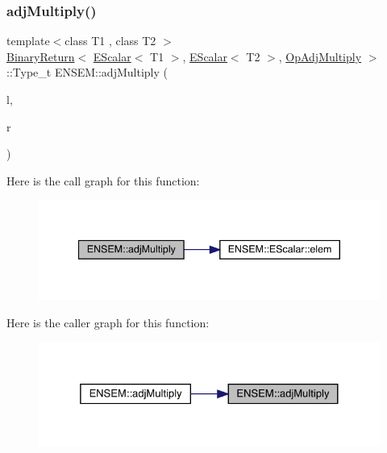 \subsubsection{\texorpdfstring{adjMultiply()}{adjMultiply()}}
{\footnotesize\ttfamily template$<$class T1 , class T2 $>$ \\
\mbox{\hyperlink{structENSEM_1_1BinaryReturn}{Binary\+Return}}$<$ \mbox{\hyperlink{classENSEM_1_1EScalar}{E\+Scalar}}$<$ T1 $>$, \mbox{\hyperlink{classENSEM_1_1EScalar}{E\+Scalar}}$<$ T2 $>$, \mbox{\hyperlink{structENSEM_1_1OpAdjMultiply}{Op\+Adj\+Multiply}} $>$\+::Type\+\_\+t E\+N\+S\+E\+M\+::adj\+Multiply (\begin{DoxyParamCaption}\item[{const \mbox{\hyperlink{classENSEM_1_1EScalar}{E\+Scalar}}$<$ T1 $>$ \&}]{l,  }\item[{const \mbox{\hyperlink{classENSEM_1_1EScalar}{E\+Scalar}}$<$ T2 $>$ \&}]{r }\end{DoxyParamCaption})\hspace{0.3cm}{\ttfamily [inline]}}

Here is the call graph for this function\+:\nopagebreak
\begin{figure}[H]
\begin{center}
\leavevmode
\includegraphics[width=340pt]{d4/dca/group__escalar_ga8cef36c4e2779c7d7dbf64b9500b053c_cgraph}
\end{center}
\end{figure}
Here is the caller graph for this function\+:\nopagebreak
\begin{figure}[H]
\begin{center}
\leavevmode
\includegraphics[width=325pt]{d4/dca/group__escalar_ga8cef36c4e2779c7d7dbf64b9500b053c_icgraph}
\end{center}
\end{figure}
\mbox{\label{group__escalar_gab3c0c146aa415c32cb9ce5a6ad426d10}} 
